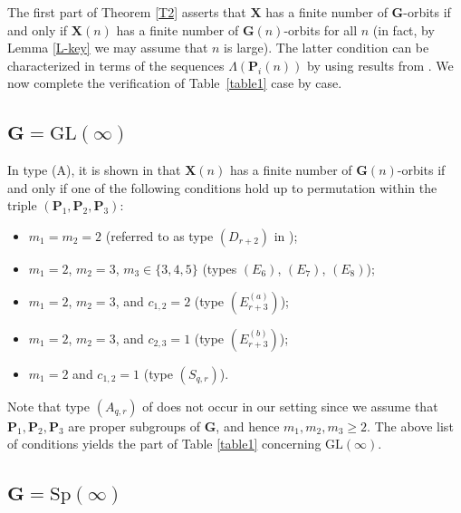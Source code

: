 \documentclass[12pt]{amsart}
\newcommand{\GL}{\mathrm{GL}}
\newcommand{\Sp}{\mathrm{Sp}}
\newcommand{\G}{\mathbf{G}}
\renewcommand{\P}{\mathbf{P}}
\newcommand{\X}{\mathbf{X}}
\numberwithin{equation}{section}
\theoremstyle{definition}
\begin{document}
\begin{appendix}
The first part of Theorem \ref{T2} asserts that $\X$ has a finite number of $\G$-orbits if and only if $\X(n)$ has a finite number of $\G(n)$-orbits for all $n$
(in fact, by Lemma \ref{L-key} we may assume that $n$ is large). The latter condition can be characterized in terms of the sequences $\Lambda(\P_i(n))$ by using results from \cite{MWZ1,MWZ2,Matsuki1,Matsuki2}. We now complete the verification of Table~\ref{table1} case by case.

\subsection{$\G=\GL(\infty)$} 
In type (A), it is shown in \cite[Theorem 2.2]{MWZ1} that $\X(n)$ has a finite number of $\G(n)$-orbits if and only if one of the following conditions hold up to permutation within the triple $(\P_1,\P_2,\P_3)$:
\begin{itemize}
\item $m_1=m_2=2$ (referred to as type $(D_{r+2})$ in \cite[Theorem 2.2]{MWZ1});
\item $m_1=2$, $m_2=3$, $m_3\in\{3,4,5\}$ (types $(E_6)$, $(E_7)$, $(E_8)$);
\item $m_1=2$, $m_2=3$, and $c_{1,2}=2$ (type $(E_{r+3}^{(a)})$);
\item $m_1=2$, $m_2=3$, and $c_{2,3}=1$ (type $(E_{r+3}^{(b)})$);
\item $m_1=2$ and $c_{1,2}=1$ (type $(S_{q,r})$).
\end{itemize}
Note that type $(A_{q,r})$ of \cite[Theorem 2.2]{MWZ1} does not occur in our setting since we assume that $\P_1,\P_2,\P_3$ are proper subgroups of $\G$, and hence $m_1,m_2,m_3\geq 2$. The above list of conditions yields the part of Table \ref{table1} concerning $\GL(\infty)$.

\subsection{$\G=\Sp(\infty)$} 


\end{appendix}
\end{document}
